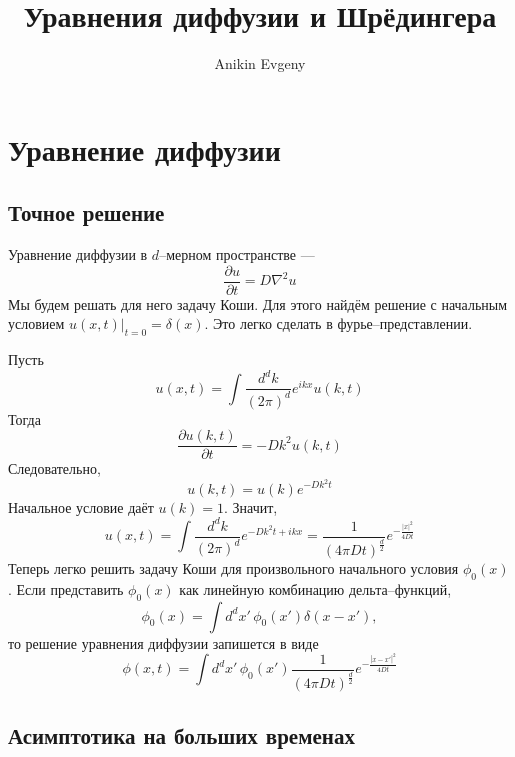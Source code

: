 \documentclass{article}
\title{Уравнения диффузии и Шрёдингера}
\author{Anikin Evgeny}
\begin{document}
\maketitle
\section{Уравнение диффузии}
\subsection{Точное решение}
Уравнение диффузии в $d$--мерном пространстве ---
\begin{equation}
   \frac{\partial u}{\partial t} = D\nabla^2 u
\end{equation}
Мы будем решать для него задачу Коши. Для этого найдём решение с начальным условием
$u(x,t)|_{t=0} = \delta(x)$. Это легко сделать в фурье--представлении.

Пусть
\begin{equation}
   u(x,t) = \int \frac{d^d k}{(2\pi)^d} e^{ikx} u(k,t)
\end{equation}
Тогда 
\begin{equation}
    \frac{\partial u(k,t)}{\partial t} = -Dk^2 u(k,t)
\end{equation}
Следовательно,
\begin{equation}
    u(k,t) = u(k) e^{-Dk^2 t}
\end{equation}
Начальное условие даёт $u(k) = 1$. Значит, 
\begin{equation}
   u(x,t) = \int \frac{d^d k}{(2\pi)^d} e^{-Dk^2t + ikx} = 
                \frac{1}{(4\pi Dt)^{\frac{d}{2}}} e^{-\frac{|x|^2}{4Dt}}
\end{equation}
Теперь легко решить задачу Коши для произвольного начального условия $\phi_0(x)$. Если 
представить $\phi_0(x)$ как линейную комбинацию дельта--функций,
\begin{equation}
    \phi_0(x) = \int d^dx'\, \phi_0(x') \delta(x - x'),
\end{equation}
то решение уравнения диффузии запишется в виде
\begin{equation}
    \phi(x,t) = \int d^dx'\, \phi_0(x') 
            \frac{1}{(4\pi Dt)^{\frac{d}{2}}} e^{-\frac{|x - x'|^2}{4Dt}}
\end{equation}
\subsection{Асимптотика на больших временах}
\end{document}
